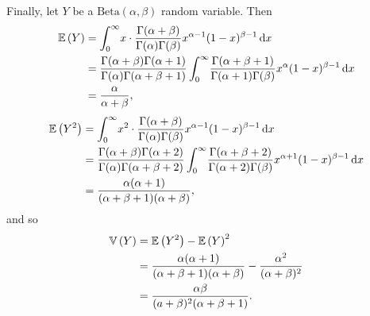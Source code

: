 \begin{ex}
  Finally, let $Y$ be a $\text{Beta}(\alpha, \beta)$ random variable. Then
  \begin{align*}
    \mathbb{E}\left(Y\right)
     & =\int_0^\infty\!x\cdot\frac{\Gamma(\alpha+\beta)}{\Gamma(\alpha)\Gamma(\beta)}x^{\alpha-1}(1-x)^{\beta-1} \,\mathrm{d}{x}                                                                             \\
     & =\frac{\Gamma(\alpha+\beta)\Gamma(\alpha+1)}{\Gamma(\alpha)\Gamma(\alpha+\beta+1)}\int_0^\infty\!\frac{\Gamma(\alpha+\beta+1)}{\Gamma(\alpha+1)\Gamma(\beta)}x^{\alpha}(1-x)^{\beta-1}\,\mathrm{d}{x} \\
     & =\frac{\alpha}{\alpha+\beta},
  \end{align*}
  \begin{align*}
    \mathbb{E}\left(Y^2\right)
     & =\int_0^\infty\!x^2\cdot\frac{\Gamma(\alpha+\beta)}{\Gamma(\alpha)\Gamma(\beta)}x^{\alpha-1}(1-x)^{\beta-1} \,\mathrm{d}{x}                                                                             \\
     & =\frac{\Gamma(\alpha+\beta)\Gamma(\alpha+2)}{\Gamma(\alpha)\Gamma(\alpha+\beta+2)}\int_0^\infty\!\frac{\Gamma(\alpha+\beta+2)}{\Gamma(\alpha+2)\Gamma(\beta)}x^{\alpha+1}(1-x)^{\beta-1}\,\mathrm{d}{x} \\
     & =\frac{\alpha(\alpha+1)}{(\alpha+\beta+1)(\alpha+\beta)},
  \end{align*}
  and so
  \begin{align*}
    \mathbb{V}\left(Y\right)
     & =\mathbb{E}\left(Y^2\right)-\mathbb{E}\left(Y\right)^2                                         \\
     & =\frac{\alpha(\alpha+1)}{(\alpha+\beta+1)(\alpha+\beta)}
    -\frac{\alpha^2}{(\alpha+\beta)^2}                          \\
     & =\frac{\alpha\beta}{(a+\beta)^2(\alpha+\beta+1)}.
  \end{align*}
\end{ex}

